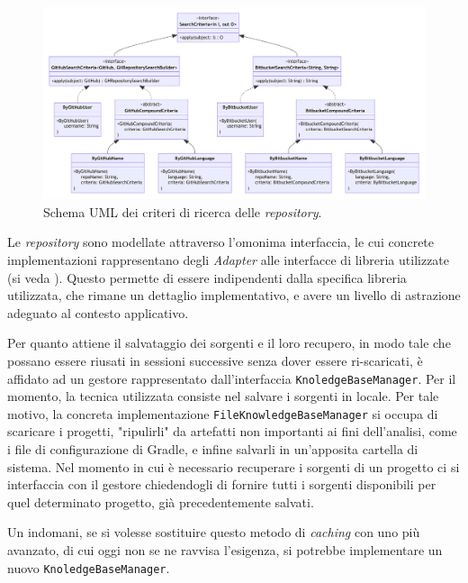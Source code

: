 \begin{figure}
    \centering
    \includegraphics[width=\textwidth]{resources/img/02-search-criteria.pdf}
    \caption{Schema UML dei criteri di ricerca delle \textit{repository}.}
    \label{img:02-search-criteria}
\end{figure}

Le \textit{repository} sono modellate attraverso l'omonima interfaccia, le cui concrete implementazioni rappresentano degli \textit{Adapter} \cite{gof} alle interfacce di libreria utilizzate (si veda ).
%
Questo permette di essere indipendenti dalla specifica libreria utilizzata, che rimane un dettaglio implementativo, e avere un livello di astrazione adeguato al contesto applicativo.

Per quanto attiene il salvataggio dei sorgenti e il loro recupero, in modo tale che possano essere riusati in sessioni successive senza dover essere ri-scaricati, è affidato ad un gestore rappresentato dall'interfaccia \texttt{KnoledgeBaseManager}.
%
Per il momento, la tecnica utilizzata consiste nel salvare i sorgenti in locale.
%
Per tale motivo, la concreta implementazione \texttt{FileKnowledgeBaseManager} si occupa di scaricare i progetti, "ripulirli" da artefatti non importanti ai fini dell'analisi, come i file di configurazione di Gradle, e infine salvarli in un'apposita cartella di sistema.
%
Nel momento in cui è necessario recuperare i sorgenti di un progetto ci si interfaccia con il gestore chiedendogli di fornire tutti i sorgenti disponibili per quel determinato progetto, già precedentemente salvati.

Un indomani, se si volesse sostituire questo metodo di \textit{caching} con uno più avanzato, di cui oggi non se ne ravvisa l'esigenza, si potrebbe implementare un nuovo \texttt{KnoledgeBaseManager}.

